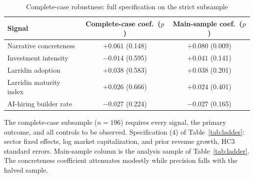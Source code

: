 \documentclass[11pt]{article}
\begin{document}
\begin{table}[H]
\centering
\begin{threeparttable}
\caption{Complete-case robustness: full specification on the strict subsample}
\label{tab:cc}
\small
\begin{tabular}{lcc}
\toprule
Signal & Complete-case coef.\ ($p$) & Main-sample coef.\ ($p$)\\
\midrule
Narrative concreteness & $+0.061$ (0.148) & $+0.080$ (0.009)\\
Investment intensity & $-0.014$ (0.595) & $+0.041$ (0.141)\\
Larridin adoption & $+0.038$ (0.583) & $+0.038$ (0.201)\\
Larridin maturity index & $+0.026$ (0.666) & $+0.024$ (0.401)\\
AI-hiring builder rate & $-0.027$ (0.224) & $-0.027$ (0.165)\\
\bottomrule
\end{tabular}
\begin{tablenotes}\footnotesize
\item The complete-case subsample ($n=196$) requires every signal, the primary
outcome, and all controls to be observed. Specification (4) of
Table~\ref{tab:ladder}: sector fixed effects, log market capitalization, and
prior revenue growth, HC3 standard errors. Main-sample column is the analysis
sample of Table~\ref{tab:ladder}. The concreteness coefficient attenuates
modestly while precision falls with the halved sample.
\end{tablenotes}
\end{threeparttable}
\end{table}
\end{document}
